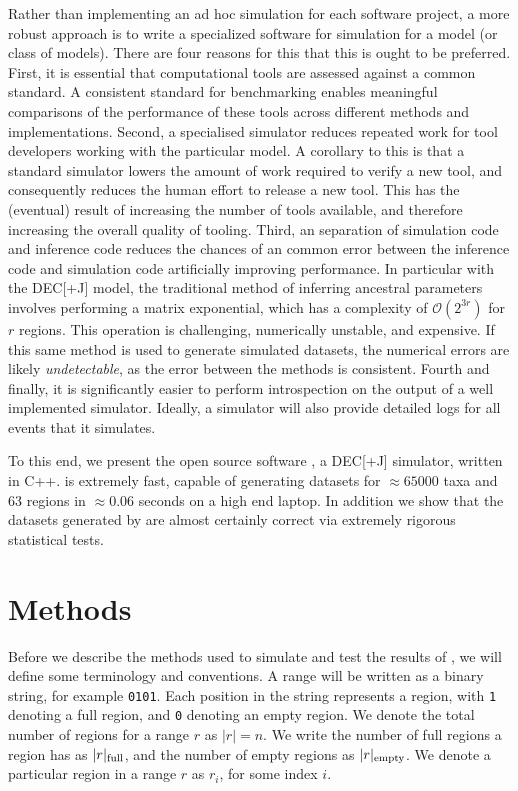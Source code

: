 \documentclass{article}
\begin{document}
Rather than implementing an ad hoc simulation for each software project, a more
robust approach is to write a specialized software for simulation for a model
(or class of models).
There are four reasons for this that this is ought to be preferred.
First, it is essential that computational tools are assessed against a common
standard.
A consistent standard for benchmarking enables meaningful comparisons of the
performance of these tools across different methods and implementations.
Second, a specialised simulator reduces repeated work for tool developers
working with the particular model.
A corollary to this is that a standard simulator lowers the amount of work
required to verify a new tool, and consequently reduces the human effort to
release a new tool.
This has the (eventual) result of increasing the number of tools available, and
therefore increasing the overall quality of tooling.
Third, an separation of simulation code and inference code reduces the chances
of an common error between the inference code and simulation code artificially
improving performance.
In particular with the DEC[+J] model, the traditional method of inferring
ancestral parameters involves performing a matrix exponential, which has a
complexity of $\mathcal{O}(2^{3r})$ for $r$ regions\cite{bettisworth_lagrange-ng_2023}.
This operation is challenging, numerically unstable, and expensive.
If this same method is used to generate simulated datasets, the numerical errors
are likely \textit{undetectable}, as the error between the methods is
consistent.
Fourth and finally, it is significantly easier to perform introspection on the
output of a well implemented simulator.
Ideally, a simulator will also provide detailed logs for all events that it
simulates.

To this end, we present the open source software \bigrig{}, a DEC[+J] simulator,
written in C++.
\bigrig{} is extremely fast, capable of generating datasets for $\approx65000$
taxa and 63 regions in $\approx0.06$ seconds on a high end laptop.
In addition we show that the datasets generated by \bigrig{} are almost
certainly correct via extremely rigorous statistical tests.

\section{Methods}

Before we describe the methods used to simulate and test the results of
\bigrig{}, we will define some terminology and conventions.
A range will be written as a binary string, for example \texttt{0101}.
Each position in the string represents a region, with \texttt{1} denoting a full
region, and \texttt{0} denoting an empty region.
We denote the total number of regions for a range \( r \) as \( |r| = n\).
We write the number of full regions a region has as \( |r|_\text{full} \), and the
number of empty regions as \( |r|_\text{empty} \).
We denote a particular region in a range $r$ as $r_i$, for some index $i$.
\end{document}
